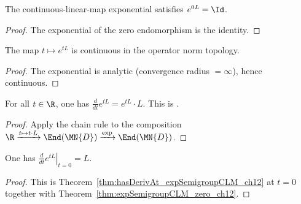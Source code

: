 \begin{theorem}
    \label{thm:expSemigroupCLM_zero_ch12}
    \leanok
    The continuous-linear-map exponential satisfies $e^{0L} = \Id$.
\end{theorem}

\begin{proof}
    \leanok
    The exponential of the zero endomorphism is the identity.
\end{proof}

\begin{theorem}\label{thm:expSemigroupCLM_continuous_ch12}
    \leanok
    The map $t \mapsto e^{tL}$ is continuous in the operator norm topology.
\end{theorem}

\begin{proof}
    \leanok
    The exponential is analytic (convergence radius $= \infty$), hence
    continuous.
\end{proof}

\begin{theorem}\label{thm:hasDerivAt_expSemigroupCLM_ch12}
    \leanok
    For all $t \in \R$, one has
    $\frac{d}{dt}e^{tL} = e^{tL} \cdot L$.
    This is \cite[Equation~(7.2)]{Wolf2012Quantum}.
\end{theorem}

\begin{proof}
    \leanok
    Apply the chain rule to the composition
    $\R \xrightarrow{t \mapsto t \cdot L} \End(\MN{D})
        \xrightarrow{\exp} \End(\MN{D})$.
\end{proof}

\begin{theorem}
    \label{thm:hasDerivAt_expSemigroupCLM_zero_ch12}
    \leanok
    One has $\left.\frac{d}{dt}e^{tL}\right|_{t=0} = L$.
\end{theorem}

\begin{proof}
    \leanok
    This is Theorem~\ref{thm:hasDerivAt_expSemigroupCLM_ch12} at $t=0$
    together with Theorem~\ref{thm:expSemigroupCLM_zero_ch12}.
\end{proof}

